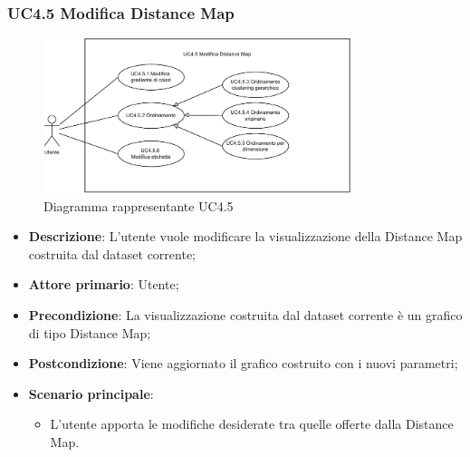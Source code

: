 \newpage
\subsubsection{UC4.5 Modifica Distance Map}
\label{ssub:uc4.5}
\begin{figure}[h]
    \centering
    \includegraphics[width=0.8\textwidth]{componenti/casi-duso/diagrammi/UC4_5.pdf}
    \caption{Diagramma rappresentante UC4.5}
    \label{fig:UC4.5}
\end{figure}

\begin{itemize}
    \item \textbf{Descrizione}: L'utente vuole modificare la visualizzazione della Distance Map costruita dal dataset corrente;
    \item \textbf{Attore primario}: Utente;
    \item \textbf{Precondizione}: La visualizzazione costruita dal dataset corrente è un grafico di tipo Distance Map;
    \item \textbf{Postcondizione}: Viene aggiornato il grafico costruito con i nuovi parametri;
    \item \textbf{Scenario principale}: 
    \begin{itemize}
        \item L'utente apporta le modifiche desiderate tra quelle offerte dalla Distance Map.
    \end{itemize}
\end{itemize}

